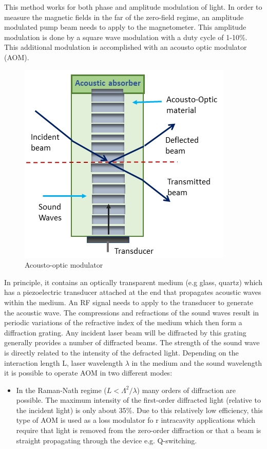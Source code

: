 This method works for both phase and amplitude modulation of light.
In order to measure the magnetic fields in the far of the zero-field
regime, an amplitude modulated pump beam needs to apply to the
magnetometer.  This amplitude modulation is done by a square wave
modulation with a duty cycle of 1-10\%.  This additional modulation is
accomplished with an acousto optic modulator (AOM).
\begin{figure}[h]
\centering
\includegraphics[width=0.7\linewidth]{figures/AOM}
\caption{Acousto-optic modulator}
\end{figure}
In principle, it contains an optically transparent medium (e.g glass, quartz) which has a piezoelectric transducer attached at the end that propagates acoustic waves within the medium. An RF signal needs to apply to the transducer to generate the acoustic wave. The compressions and refractions of the sound waves result in periodic variations of the refractive index of the medium which then form a diffraction grating. Any incident laser beam will be diffracted by this grating generally provides a number of diffracted beams. The strength of the sound wave is directly related to the intensity of the defracted light. Depending on the interaction length L, laser wavelength $\lambda$ in the medium and the sound wavelength it is possible to operate AOM in two different modes: 
\begin{itemize}
\item  In the Raman-Nath regime ($L<\Lambda^2/\lambda$) many orders of diffraction are possible. The maximum intensity of the first-order diffracted light (relative to the incident light) is only about 35\%. Due to this relatively low efficiency, this type of AOM is used as a loss modulator fo r intracavity applications which require that light is removed from the zero-order diffraction or that a beam is straight propagating through the device e.g. Q-switching.


\end{itemize}
